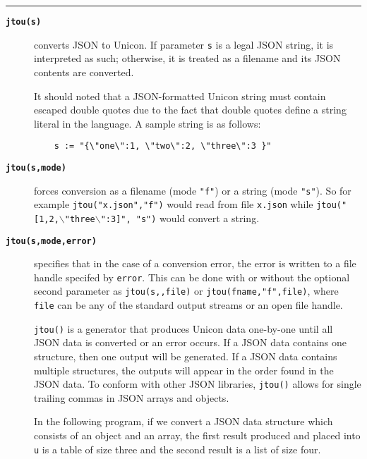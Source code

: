 \documentclass[letterpaper,12pt]{article}
\begin{document}
\noindent\rule{\textwidth}{1pt}

\begin{description}

\item[{\tt\bf jtou(s)}] converts JSON to Unicon.
  If parameter {\tt s} is a legal JSON string, it is interpreted as such;
  otherwise, it is treated as a filename and its JSON contents are converted.

  It should noted that a JSON-formatted Unicon string must contain escaped
  double quotes due to the fact that double quotes define a string literal
  in the language. A sample string is as follows:

  \begin{verbatim}
    s := "{\"one\":1, \"two\":2, \"three\":3 }"
  \end{verbatim}
\vspace{-1em}

\item[{\tt\bf jtou(s,mode)}] forces conversion as a filename (mode {\tt "f"})
  or a string (mode {\tt "s"}).
  So for example {\tt jtou("x.json","f")} would read from file {\tt x.json}
  while {\tt jtou("[1,2,{$\backslash$"three$\backslash$":3}]", "s")} would 
  convert a string.

\item[{\tt\bf jtou(s,mode,error)}] specifies that in the case of a conversion
  error, the error is written to a file handle specifed by {\tt error}.
  This can be done with or without the optional second parameter as 
  {\tt jtou(s,,file)} or {\tt jtou(fname,"f",file)}, where {\tt file}
  can be any of the standard output streams or an open file
  handle.

\vspace{1em}

{\tt jtou()} is a generator that produces Unicon data one-by-one until
all JSON data is converted or an error occurs. If a JSON data contains 
one structure,
then one output will be generated. If a JSON data contains multiple 
structures, the outputs will appear in the order found in the JSON data.
To conform with other JSON libraries, {\tt jtou()} allows for single
trailing commas in JSON arrays and objects.

In the following program, if we convert a JSON data structure which
consists of an object and an array, the first result produced and
placed into {\tt u} is a table of size three and the second result
is a list of size four.


\end{description}
\end{document}
